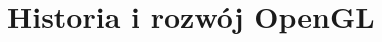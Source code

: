 \documentclass[12pt]{article}
\begin{document}
\baselineskip





\section{Historia i rozwój OpenGL}





\end{document}
